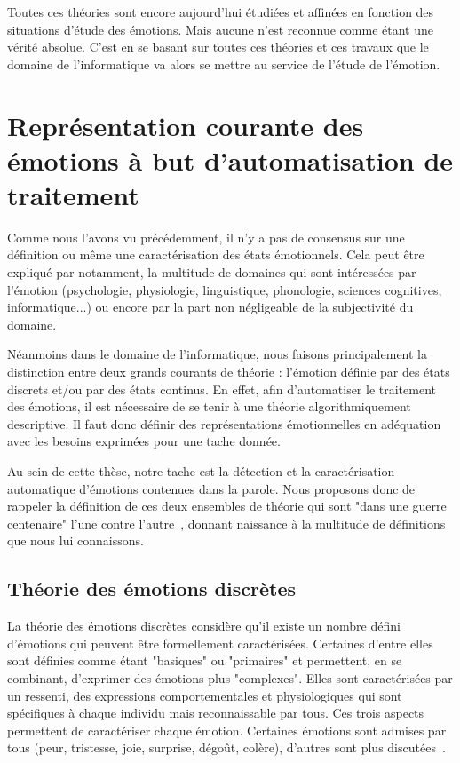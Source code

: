 Toutes ces théories sont encore aujourd'hui étudiées et affinées en fonction des situations d'étude des émotions. Mais aucune n'est reconnue comme étant une vérité absolue. C'est en se basant sur toutes ces théories et ces travaux que le domaine de l'informatique va alors se mettre au service de l'étude de l'émotion.


\section{Représentation courante des émotions à but d'automatisation de traitement}
Comme nous l'avons vu précédemment, il n'y a pas de consensus sur une définition ou même une caractérisation des états émotionnels. Cela peut être expliqué par notamment, la multitude de domaines qui sont intéressées par l'émotion (psychologie, physiologie, linguistique, phonologie, sciences cognitives, informatique...) ou encore par la part non négligeable de la subjectivité du domaine.

Néanmoins dans le domaine de l'informatique, nous faisons principalement la distinction entre deux grands courants de théorie : l'émotion définie par des états discrets et/ou par des états continus. En effet, afin d'automatiser le traitement des émotions, il est nécessaire de se tenir à une théorie algorithmiquement descriptive. Il faut donc définir des représentations émotionnelles en adéquation avec les besoins exprimées pour une tache donnée.

Au sein de cette thèse, notre tache est la détection et la caractérisation automatique d'émotions contenues dans la parole. Nous proposons donc de rappeler la définition de ces deux ensembles de théorie qui sont "dans une guerre centenaire" l'une contre l'autre~\cite{Lindquist2013}, donnant naissance à la multitude de définitions que nous lui connaissons.

\subsection{Théorie des émotions discrètes}
La théorie des émotions discrètes considère qu'il existe un nombre défini d'émotions qui peuvent être formellement caractérisées. Certaines d'entre elles sont définies comme étant "basiques" ou "primaires" et permettent, en se combinant, d'exprimer des émotions plus "complexes". Elles sont caractérisées par un ressenti, des expressions comportementales et physiologiques qui sont spécifiques à chaque individu mais reconnaissable par tous. Ces trois aspects permettent de caractériser chaque émotion. Certaines émotions sont admises par tous (peur, tristesse, joie, surprise, dégoût, colère), d'autres sont plus discutées~\cite{Cosnier1994}.

